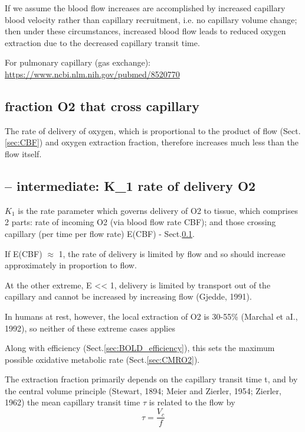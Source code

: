If we assume the blood flow increases are accomplished by increased capillary
blood velocity rather than capillary recruitment, i.e. no capillary volume
change; then under these circumstances, increased blood flow leads to reduced
oxygen extraction due to the decreased capillary transit time.


For pulmonary capillary (gas exchange):
\url{https://www.ncbi.nlm.nih.gov/pubmed/8520770}


\subsection{fraction O2 that cross capillary}
\label{sec:BOLD_Ef}


The rate of delivery of oxygen, which is proportional to the product of flow
(Sect.\ref{sec:CBF}) and oxygen extraction fraction, therefore increases much
less than the flow itself.


\subsection{-- intermediate: K\_1 rate of delivery O2}

$K_1$ is the rate parameter which governs delivery of O2 to tissue, which
comprises 2 parts: rate of incoming O2 (via blood flow rate CBF); and those
crossing capillary (per time per flow rate) E(CBF) - Sect.\ref{sec:BOLD_Ef}.

\begin{mdframed}

If E(CBF) $\approx$ 1, the rate of delivery is limited by flow and so should
increase approximately in proportion to flow. 

At the other extreme, E << 1, delivery is limited by transport out of the
capillary and cannot be increased by increasing flow (Gjedde, 1991).

In humans at rest, however, the local extraction of O2 is 30-55\% (Marchal et
aI., 1992), so neither of these extreme cases applies

\end{mdframed}


Along with efficiency (Sect.\ref{sec:BOLD_efficiency}), this sets the maximum
possible oxidative metabolic rate (Sect.\ref{sec:CMRO2}).

The extraction fraction primarily depends on the capillary transit time t, and
by the central volume principle (Stewart, 1894; Meier and Zierler, 1954;
Zierler, 1962) the mean capillary transit time $\tau$ is related to the flow by
\begin{equation}
\tau = \frac{V_c}{f}
\end{equation}


